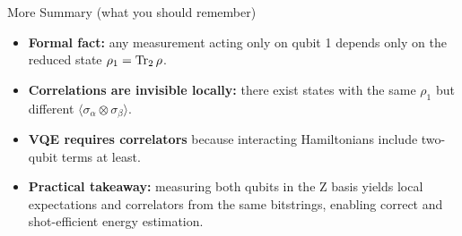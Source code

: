 \documentclass[aspectratio=169]{beamer}
\begin{document}
\begin{frame}{More Summary (what you should remember)}
\begin{itemize}
\item \textbf{Formal fact:} any measurement acting only on qubit 1 depends only on the reduced state \(\rho_1=\Tr_2\rho\).
\item \textbf{Correlations are invisible locally:} there exist states with the same \(\rho_1\) but different \(\langle \sigma_\alpha\otimes\sigma_\beta\rangle\).
\item \textbf{VQE requires correlators} because interacting Hamiltonians include two-qubit terms at least.
\item \textbf{Practical takeaway:} measuring both qubits in the Z basis yields local expectations and correlators from the same bitstrings, enabling correct and shot-efficient energy estimation.
\end{itemize}
\end{frame}
\end{document}
